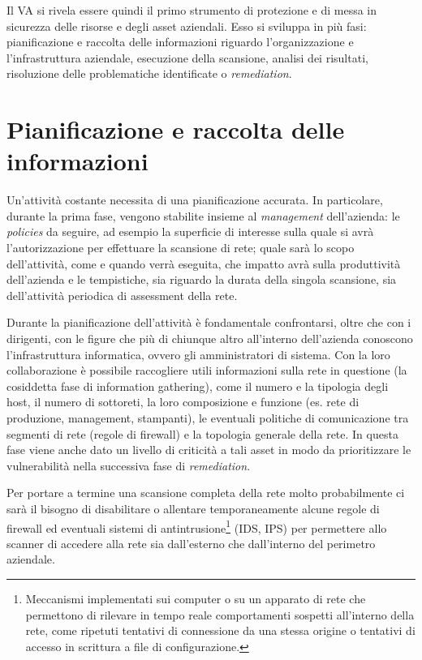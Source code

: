 \documentclass[target=bach,aauheader=]{thud}
\begin{document}
Il VA si rivela essere quindi il primo strumento di protezione e di messa in sicurezza delle risorse e degli asset aziendali. Esso si sviluppa in più fasi: pianificazione e raccolta delle informazioni riguardo l’organizzazione e l’infrastruttura aziendale, esecuzione della scansione, analisi dei risultati, risoluzione delle problematiche identificate o \textit{remediation}.


\section{Pianificazione e raccolta delle informazioni}
Un’attività costante necessita di una pianificazione accurata. In particolare, durante la prima fase, vengono stabilite insieme al \textit{management} dell’azienda: le \textit{policies} da seguire, ad esempio la superficie di interesse sulla quale si avrà l’autorizzazione per effettuare la scansione di rete; quale sarà lo scopo dell’attività, come e quando verrà eseguita, che impatto avrà sulla produttività dell’azienda e le tempistiche, sia riguardo la durata della singola scansione, sia dell’attività periodica di assessment della rete.

Durante la pianificazione dell’attività è fondamentale confrontarsi, oltre che con i dirigenti, con le figure che più di chiunque altro all’interno dell’azienda conoscono l’infrastruttura informatica, ovvero gli amministratori di sistema. Con la loro collaborazione è possibile raccogliere utili informazioni sulla rete in questione (la cosiddetta fase di information gathering), come il numero e la tipologia degli host, il numero di sottoreti, la loro composizione e funzione (es. rete di produzione, management, stampanti), le eventuali politiche di comunicazione tra segmenti di rete (regole di firewall) e la topologia generale della rete. In questa fase viene anche dato un livello di criticità a tali asset in modo da prioritizzare le vulnerabilità nella successiva fase di \textit{remediation}.

Per portare a termine una scansione completa della rete molto probabilmente ci sarà il bisogno di disabilitare o allentare temporaneamente alcune regole di firewall ed eventuali sistemi di antintrusione\footnote{Meccanismi implementati sui computer o su un apparato di rete che permettono di rilevare in tempo reale comportamenti sospetti all’interno della rete, come ripetuti tentativi di connessione da una stessa origine o tentativi di accesso in scrittura a file di configurazione.} (IDS, IPS) per permettere allo scanner di accedere alla rete sia dall’esterno che dall’interno del perimetro aziendale. 
\end{document}
